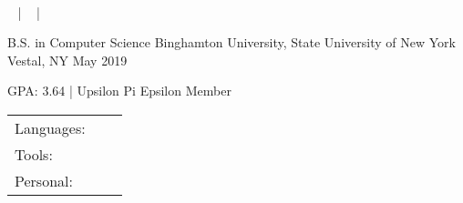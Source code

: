 \documentclass[]{awesome-cv}
\begin{document}
\begin{center}
	\ \ \  \\
	\vspace{2mm}
	{\faEnvelope\ } | {\faPhone\ } | {\faLink\ }
\end{center}

\begin{cventries}
	\cventry
	{B.S. in Computer Science}
	{Binghamton University, State University of New York}
	{Vestal, NY}
	{May 2019}
    {\begin{cvitems}
        \item {GPA: 3.64 | Upsilon Pi Epsilon Member}
    \end{cvitems}}
\end{cventries}
\vspace{-2mm}

\begin{cventries}
	\cventry
	{}
	{\def\arraystretch{1.15}{\begin{tabular}{ l l }
		Languages:  & \ \ \skill{{ C++, Python, Java, C, C\#, JavaScript}} \\
		Tools:  & \ \ \skill{{ React, Angular, Git, Vim }} \\
		Personal:  & \ \ \skill{{ Communication, organization, teamwork, leadership, critical thinking}} \\
	\end{tabular}}}
	{}
	{}
	{}
\end{cventries}
\vspace{-9mm}
\end{document}
